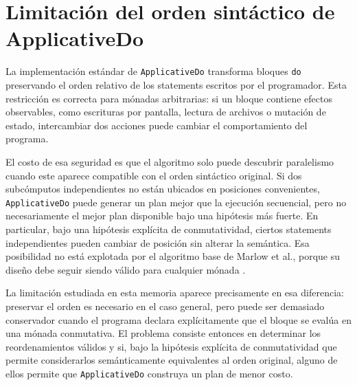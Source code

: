 
\section{Limitación del orden sintáctico de ApplicativeDo}

La implementación estándar de \texttt{ApplicativeDo} transforma bloques \texttt{do} preservando el orden relativo de los statements escritos por el programador. Esta restricción es correcta para mónadas arbitrarias: si un bloque contiene efectos observables, como escrituras por pantalla, lectura de archivos o mutación de estado, intercambiar dos acciones puede cambiar el comportamiento del programa.

El costo de esa seguridad es que el algoritmo solo puede descubrir paralelismo cuando este aparece compatible con el orden sintáctico original. Si dos subcómputos independientes no están ubicados en posiciones convenientes, \texttt{ApplicativeDo} puede generar un plan mejor que la ejecución secuencial, pero no necesariamente el mejor plan disponible bajo una hipótesis más fuerte. En particular, bajo una hipótesis explícita de conmutatividad, ciertos statements independientes pueden cambiar de posición sin alterar la semántica. Esa posibilidad no está explotada por el algoritmo base de Marlow et al., porque su diseño debe seguir siendo válido para cualquier mónada \cite{MarlowPJKM2016}.

La limitación estudiada en esta memoria aparece precisamente en esa diferencia: preservar el orden es necesario en el caso general, pero puede ser demasiado conservador cuando el programa declara explícitamente que el bloque se evalúa en una mónada conmutativa. El problema consiste entonces en determinar los reordenamientos válidos y si, bajo la hipótesis explícita de conmutatividad que permite considerarlos semánticamente equivalentes al orden original, alguno de ellos permite que \texttt{ApplicativeDo} construya un plan de menor costo.
